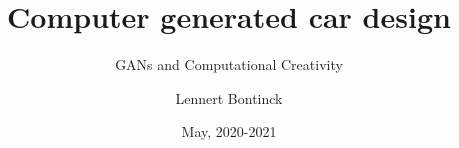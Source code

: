 \title{Computer generated car design}
\subtitle{GANs and Computational Creativity}
\author{Lennert Bontinck}
\date{May, 2020-2021}
